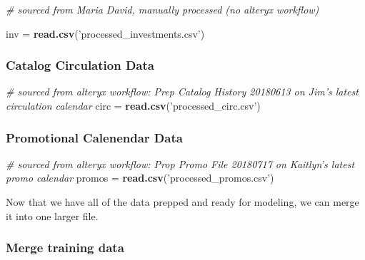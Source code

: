 \documentclass[]{article}
\newenvironment{Shaded}{\begin{snugshade}}{\end{snugshade}}
\newcommand{\KeywordTok}[1]{\textcolor[rgb]{0.13,0.29,0.53}{\textbf{{#1}}}}
\newcommand{\StringTok}[1]{\textcolor[rgb]{0.31,0.60,0.02}{{#1}}}
\newcommand{\CommentTok}[1]{\textcolor[rgb]{0.56,0.35,0.01}{\textit{{#1}}}}
\newcommand{\NormalTok}[1]{{#1}}
\begin{document}
\begin{Shaded}
\begin{Highlighting}[]
\CommentTok{# sourced from Maria David, manually processed (no alteryx workflow)}

\NormalTok{inv =}\StringTok{ }\KeywordTok{read.csv}\NormalTok{(}\StringTok{'processed_investments.csv'}\NormalTok{)}
\end{Highlighting}
\end{Shaded}

\subsubsection{Catalog Circulation Data}\label{catalog-circulation-data}

\begin{Shaded}
\begin{Highlighting}[]
\CommentTok{# sourced from alteryx workflow: Prep Catalog History 20180613 on Jim's latest circulation calendar}
\NormalTok{circ =}\StringTok{ }\KeywordTok{read.csv}\NormalTok{(}\StringTok{'processed_circ.csv'}\NormalTok{)}
\end{Highlighting}
\end{Shaded}

\subsubsection{Promotional Calenendar
Data}\label{promotional-calenendar-data}

\begin{Shaded}
\begin{Highlighting}[]
\CommentTok{# sourced from alteryx workflow: Prop Promo File 20180717 on Kaitlyn's latest promo calendar}
\NormalTok{promos =}\StringTok{ }\KeywordTok{read.csv}\NormalTok{(}\StringTok{'processed_promos.csv'}\NormalTok{)}
\end{Highlighting}
\end{Shaded}

Now that we have all of the data prepped and ready for modeling, we can
merge it into one larger file.

\subsubsection{Merge training data}\label{merge-training-data}
\end{document}
